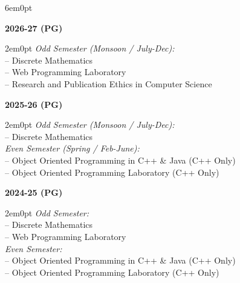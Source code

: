 \documentclass[11pt,a4paper]{moderncv}
\begin{document}
\begin{adjustwidth}{6em}{0pt}
	
	\textbf{2026-27 (PG)}

	\begin{adjustwidth}{2em}{0pt}
		\textit{Odd Semester (Monsoon / July-Dec):} \\
		\hspace*{1.5em}-- Discrete Mathematics \\
		\hspace*{1.5em}-- Web Programming Laboratory \\
		\hspace*{1.5em}-- Research and Publication Ethics in Computer Science \\		
				

	\end{adjustwidth}


	\textbf{2025-26 (PG)}
	
	\begin{adjustwidth}{2em}{0pt}
		\textit{Odd Semester (Monsoon / July-Dec):} \\
		\hspace*{1.5em}-- Discrete Mathematics \\
		
		\textit{Even Semester (Spring / Feb-June):} \\
		\hspace*{1.5em}-- Object Oriented Programming in C++ \& Java (C++ Only) \\
		\hspace*{1.5em}-- Object Oriented Programming Laboratory (C++ Only) \\
	\end{adjustwidth}
	
	
	\textbf{2024-25 (PG)}
	
	\begin{adjustwidth}{2em}{0pt}
		\textit{Odd Semester:} \\
		\hspace*{1.5em}-- Discrete Mathematics \\
		\hspace*{1.5em}-- Web Programming Laboratory \\
		
		\textit{Even Semester:} \\
		\hspace*{1.5em}-- Object Oriented Programming in C++ \& Java (C++ Only) \\
		\hspace*{1.5em}-- Object Oriented Programming Laboratory (C++ Only) \\
	\end{adjustwidth}
	

\end{adjustwidth}
\end{document}
